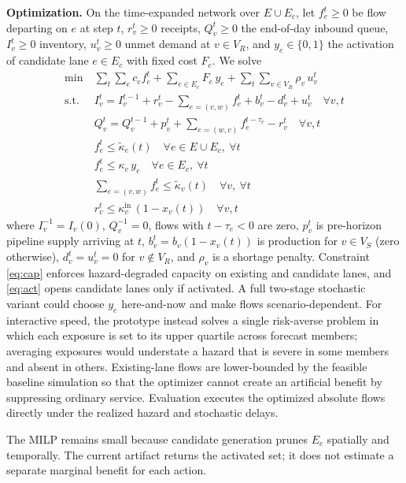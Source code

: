 \documentclass[conference]{IEEEtran}
\begin{document}
\textbf{Optimization.} On the time-expanded network over $E\cup E_c$, let
$f_e^t\ge0$ be flow departing on $e$ at step $t$, $r_v^t\ge0$ receipts,
$Q_v^t\ge0$ the end-of-day inbound queue, $I_v^t\ge0$ inventory,
$u_v^t\ge0$ unmet demand at $v\in V_R$, and $y_e\in\{0,1\}$ the
activation of candidate lane $e\in E_c$ with fixed cost $F_e$. We solve
\begin{align}
\min\ & \sum_{t}\sum_{e} c_e f_e^t + \sum_{e\in E_c} F_e\,y_e
       + \sum_{t}\sum_{v\in V_R} \rho_v\,u_v^t \label{eq:obj}\\
\text{s.t.}\ & I_v^{t} = I_v^{t-1} + r_v^t
   - \!\!\sum_{e=(v,w)}\! f_e^{t}
   + b_v^t - d_v^t + u_v^t \quad \forall v,t \label{eq:bal}\\
& Q_v^t=Q_v^{t-1}+p_v^t+\!\!\sum_{e=(w,v)}\!f_e^{t-\tau_e}-r_v^t
  \quad \forall v,t \label{eq:queue}\\
& f_e^t \le \tilde\kappa_e(t) \quad \forall e\in E\cup E_c,\ \forall t \label{eq:cap}\\
& f_e^t \le \kappa_e\, y_e \quad \forall e\in E_c,\ \forall t \label{eq:act}\\
& \textstyle\sum_{e=(v,w)} f_e^t \le \tilde\kappa_v(t) \quad \forall v,\ \forall t
  \label{eq:nodecap}\\
& r_v^t \le \kappa^{\mathrm{in}}_v\,(1-x_v(t)) \quad \forall v,t
  \label{eq:recvcap}
\end{align}
where $I_v^{-1}=I_v(0)$, $Q_v^{-1}=0$, flows with $t-\tau_e<0$ are zero,
$p_v^t$ is pre-horizon pipeline supply arriving at $t$,
$b_v^t=b_v(1-x_v(t))$ is production for $v\in V_S$ (zero otherwise),
$d_v^t=u_v^t=0$ for $v\notin V_R$, and $\rho_v$ is a shortage penalty.
Constraint
\eqref{eq:cap} enforces hazard-degraded capacity on existing and candidate
lanes, and \eqref{eq:act} opens candidate lanes only if activated. A full
two-stage stochastic variant could choose $y_e$ here-and-now and make flows
scenario-dependent. For interactive speed, the prototype instead solves a
single risk-averse problem in which
each exposure is set to its upper quartile across forecast members;
averaging exposures would understate a hazard that is severe in some
members and absent in others. Existing-lane flows are lower-bounded by
the feasible baseline simulation so that the optimizer cannot create an
artificial benefit by suppressing ordinary service. Evaluation executes
the optimized absolute flows directly under the realized hazard and
stochastic delays.

The MILP remains small because candidate generation prunes $E_c$
spatially and temporally. The current artifact returns the activated set;
it does not estimate a separate marginal benefit for each action.
\end{document}
